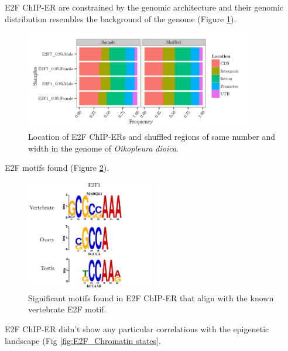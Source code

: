 \documentclass[11pt,twoside,a4paper]{report}
\begin{document}
		E2F ChIP-ER are constrained by the genomic architecture and their genomic distribution resembles the background of the genome (Figure \ref{fig:genomic_location}).
		  		
		\begin{figure}[here]
			\centering
			\includegraphics[width=0.9\textwidth]{pngs/E2F_genomicLocation.png}
			\caption{Location of E2F ChIP-ERs and shuffled regions of same number and width in the genome of \textit{Oikopleura dioica}.}
			\label{fig:genomic_location}
		\end{figure}
		
		E2F motifs found (Figure \ref{fig:E2F_motifs}).
		
		\begin{figure}[here]
			\centering
			\includegraphics[width=0.5\textwidth]{pngs/E2F_motifs.png}
			\caption{Significant motifs found in E2F ChIP-ER that align with the known vertebrate E2F motif.}
			\label{fig:E2F_motifs}
		\end{figure}
		
		E2F ChIP-ER didn't show any particular correlations with the epigenetic landscape (Fig \ref{fig:E2F_Chromatin states}.
		
\end{document}
